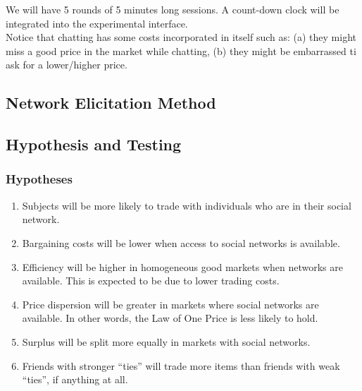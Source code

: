 \documentclass{article}
\begin{document}
We will have 5 rounds of 5 minutes long sessions. A count-down clock will be integrated into the experimental interface.\\

Notice that chatting has some costs incorporated in itself such as: (a) they might miss a good price in the market while chatting, (b) they might be embarrassed ti ask for a lower/higher price.

\subsection{Network Elicitation Method}



\subsection{Hypothesis and Testing}
\subsubsection{Hypotheses}
\begin{enumerate}[{Hypothesis} 1]
    \item Subjects will be more likely to trade with individuals who are in
        their social network.
    \item Bargaining costs will be lower when access to social networks is
        available.
    \item Efficiency will be higher in homogeneous good markets when networks
        are available. This is expected to be due to lower trading costs.
    \item Price dispersion will be greater in markets where social networks are
        available. In other words, the Law of One Price is less likely to hold.
    \item Surplus will be split more equally in markets with social networks.
    \item Friends with stronger ``ties'' will trade more items than friends with
        weak ``ties'', if anything at all.
\end{enumerate}
\end{document}
